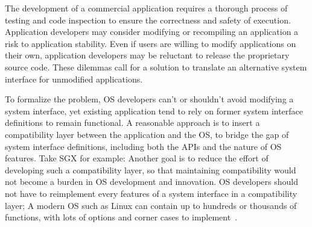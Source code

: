 The development of a commercial application
requires a thorough process of testing and code inspection to ensure the correctness and safety of execution.
Application developers may consider modifying or recompiling an application %
a risk to application stability.
Even if users are willing to modify applications on their own,
application developers may be reluctant to release the proprietary source code.
These dilemmas call for a solution
to translate an alternative system interface for unmodified applications.





To formalize the problem,
OS developers can't or shouldn't avoid modifying a system interface,
yet existing application tend to rely on former system interface definitions to remain functional.
A reasonable approach is to insert a compatibility layer
between the application and the OS,
to bridge the gap of system interface definitions, including both the APIs and the nature of OS features.
Take SGX for example:
Another goal is to reduce the effort of developing such a compatibility layer,
so that maintaining compatibility would not become a burden in OS development and innovation.
OS developers should not have
to reimplement every features of a system interface in a compatibility layer;
A modern OS such as Linux
can contain up to hundreds or thousands of functions,
with lots of options and corner cases to implement~\cite{linux-man-syscall}.








